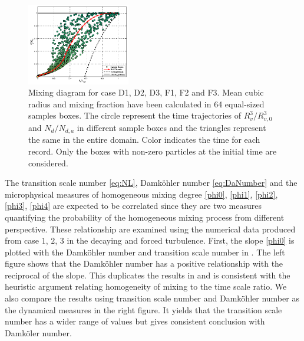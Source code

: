 \begin{figure}[!htbp]
\includegraphics[width=0.4\textwidth]{Figures/mixing_casef3}
\caption{Mixing diagram for case D1, D2, D3, F1, F2 and F3. Mean cubic radius
and mixing fraction have been calculated in 64 equal-sized samples boxes. The
circle represent the time trajectories of $R_v^3/R_{v,0}^3$ and $N_d/N_{d,a}$
in different sample boxes and the triangles represent the same in the entire
domain. Color indicates the time for each record. Only the boxes with non-zero
particles at the initial time are considered.}
\label{fig:mixing_diagram}
\end{figure}

The transition scale number \ref{eq:NL}, Damk\"{o}hler number \ref{eq:DaNumber} and the 
microphysical measures of homogeneous mixing degree \ref{phi0}, \ref{phi1}, \ref{phi2}, \ref{phi3}, 
\ref{phi4} are expected to be correlated since they are two measures quantifying the probability of 
the homogeneous mixing process from different perspective. These relationship are examined using 
the numerical data produced from case $1$, $2$, $3$ in the decaying and forced turbulence. First, 
the slope \ref{phi0} is plotted with the Damk\"{o}hler number and transition scale number in . The left figure shows that the Damk\"{o}hler number has a positive relationship with the reciprocal of the slope. This duplicates the results in \cite{Andrejczuk2009} and is consistent with the heuristic argument relating homogeneity of mixing to the time scale ratio. We also compare the results using transition scale number and Damk\"{o}hler number as the dynamical measures in the right figure. It yields that the transition scale number has a wider range of values but gives consistent conclusion with Damk\"{o}ler number.

